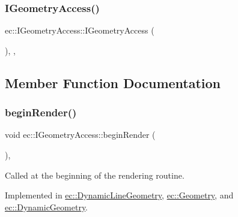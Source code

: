 \mbox{\label{classec_1_1_i_geometry_access_aaf9faa0f583e89aa0b27db7cecbb7c6e}} 
\subsubsection{\texorpdfstring{I\+Geometry\+Access()}{IGeometryAccess()}}
{\footnotesize\ttfamily ec\+::\+I\+Geometry\+Access\+::\+I\+Geometry\+Access (\begin{DoxyParamCaption}{ }\end{DoxyParamCaption})\hspace{0.3cm}{\ttfamily [explicit]}, {\ttfamily [protected]}, {\ttfamily [default]}}



\subsection{Member Function Documentation}
\mbox{\label{classec_1_1_i_geometry_access_a17a87aca44e2a23a6185e78262e02652}} 
\subsubsection{\texorpdfstring{begin\+Render()}{beginRender()}}
{\footnotesize\ttfamily void ec\+::\+I\+Geometry\+Access\+::begin\+Render (\begin{DoxyParamCaption}{ }\end{DoxyParamCaption})\hspace{0.3cm}{\ttfamily [protected]}, {}}

Called at the beginning of the rendering routine. 

Implemented in \mbox{\hyperlink{classec_1_1_dynamic_line_geometry_ada76857787fc930fd44382e838842687}{ec\+::\+Dynamic\+Line\+Geometry}}, \mbox{\hyperlink{classec_1_1_geometry_aeca5f0e52e7c2e4b352ede1a6e7c3f5b}{ec\+::\+Geometry}}, and \mbox{\hyperlink{classec_1_1_dynamic_geometry_ae4eb49e852a4c300325a288bf9ea4408}{ec\+::\+Dynamic\+Geometry}}.

